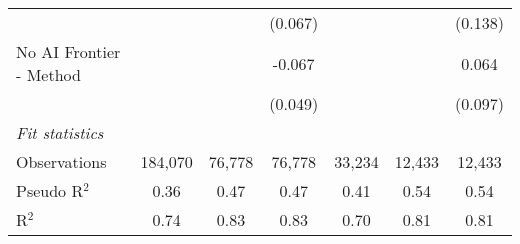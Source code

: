 \begin{tabular}{lcccccc}
                           &                &                & (0.067)        &                &               & (0.138)\\   
   No AI Frontier - Method &                &                & -0.067         &                &               & 0.064\\   
                           &                &                & (0.049)        &                &               & (0.097)\\   
   \midrule
   \emph{Fit statistics}\\
   Observations            & 184,070        & 76,778         & 76,778         & 33,234         & 12,433        & 12,433\\  
   Pseudo R$^2$            & 0.36           & 0.47           & 0.47           & 0.41           & 0.54          & 0.54\\  
   R$^2$                   & 0.74           & 0.83           & 0.83           & 0.70           & 0.81          & 0.81\\  
   

\end{tabular}
